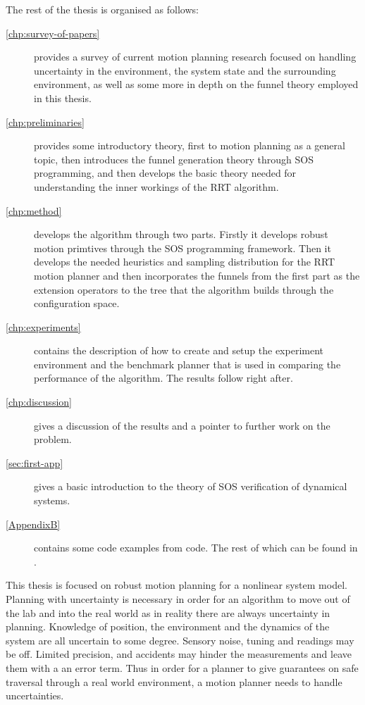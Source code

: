 The rest of the thesis is organised as follows:
\begin{description}
    \item[\cref{chp:survey-of-papers}]
      provides a survey of current motion planning research focused on handling
      uncertainty in the environment, the system state and the surrounding
      environment, as well as some more in depth on the funnel theory employed
      in this thesis.
    
    \item[\cref{chp:preliminaries}]
      provides some introductory theory, first to motion planning as a general
      topic, then introduces the funnel generation theory through \ac{SOS}
      programming, and then develops the basic theory needed for understanding
      the inner workings of the \ac{RRT} algorithm.
    
    \item[\cref{chp:method}]
      develops the \rrtfunnel{} algorithm through two parts. Firstly it develops
      robust motion primtives through the \ac{SOS} programming framework. Then
      it develops the needed heuristics and sampling distribution for the
      \ac{RRT} motion planner and then incorporates the funnels from the first
      part as the extension operators to the tree that the algorithm builds
      through the configuration space.
    
    \item[\cref{chp:experiments}]
      contains the description of how to create and setup the experiment
      environment and the benchmark planner that is used in comparing the
      performance of the \rrtfunnel{} algorithm. The results follow right after.
    
    \item[\cref{chp:discussion}]
      gives a discussion of the results and a pointer to further work on the problem.

    \item[\cref{sec:first-app}]
      gives a basic introduction to the theory of \ac{SOS} verification of
      dynamical systems.

    \item[\cref{AppendixB}]
      contains some code examples from code. The rest of which can be found in \cite{my-code}.
\end{description}

This thesis is focused on robust motion planning for a nonlinear system model.
Planning with uncertainty is necessary in order for an algorithm to move out of
the lab and into the real world as in reality there are always uncertainty in
planning. Knowledge of position, the environment and the dynamics of the system
are all uncertain to some degree. Sensory noise, tuning and readings may be off.
Limited precision, and accidents may hinder the measurements and leave them with
a an error term. Thus in order for a planner to give guarantees on safe
traversal through a real world environment, a motion planner needs to handle
uncertainties.

